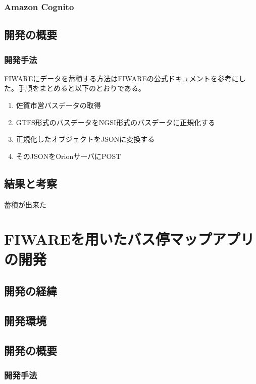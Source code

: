 \documentclass[a4paper, 12pt]{jsreport}
\begin{document}
  \subsection{Amazon
  Cognito}
  \par
  \section{開発の概要}


  \subsection{開発手法}
  FIWAREにデータを蓄積する方法はFIWAREの公式ドキュメントを参考にした。手順をまとめると以下のとおりである。
  \begin{enumerate}
    \item 佐賀市営バスデータの取得

    \item GTFS形式のバスデータをNGSI形式のバスデータに正規化する

    \item 正規化したオブジェクトをJSONに変換する

    \item そのJSONをOrionサーバにPOST
  \end{enumerate}
  \par

  \section{結果と考察}
  \par 蓄積が出来た

  \chapter{FIWAREを用いたバス停マップアプリの開発}
  \section{開発の経緯}
  \section{開発環境}
  \section{開発の概要}
  \subsection{開発手法}
\end{document}
